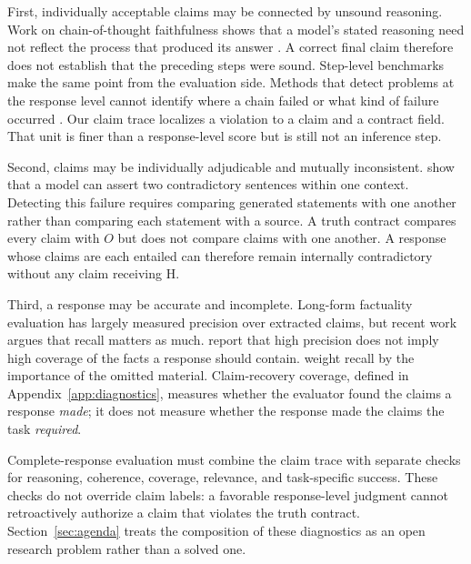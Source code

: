 \documentclass{clv2025}
\newcommand{\Hall}{\textsc{H}}
\begin{document}
First, individually acceptable claims may be connected by unsound reasoning.
Work on chain-of-thought faithfulness shows that a model's stated reasoning need
not reflect the process that produced its answer
\citep{arcuschin_cot_2025}. A correct final claim therefore does not establish
that the preceding steps were sound.
Step-level benchmarks make the same point from the evaluation side.
Methods that detect problems at the response level cannot identify where a
chain failed or what kind of failure occurred \citep{pham_grace_2026}.
Our claim trace localizes a violation to a claim and a contract field.
That unit is finer than a response-level score but is still not an inference
step.

Second, claims may be individually adjudicable and mutually inconsistent.
\citet{mundler_selfcontradictory_2024} show that a model can assert two
contradictory sentences within one context.
Detecting this failure requires comparing generated statements with one another
rather than comparing each statement with a source.
A truth contract compares every claim with $O$ but does not compare claims with
one another. A response whose claims are each entailed can therefore remain
internally contradictory without any claim receiving \Hall.

Third, a response may be accurate and incomplete.
Long-form factuality evaluation has largely measured precision over extracted
claims, but recent work argues that recall matters as much.
\citet{liu_verifact_2025} report that high precision does not imply high coverage
of the facts a response should contain. \citet{jafari_recall_2026} weight recall
by the importance of the omitted material.
Claim-recovery coverage, defined in
Appendix~\ref{app:diagnostics}, measures whether the evaluator found the claims
a response \emph{made}; it does not measure whether the response made the claims
the task \emph{required}.

Complete-response evaluation must combine the claim trace with separate checks
for reasoning, coherence, coverage, relevance, and task-specific success.
These checks do not override claim labels: a favorable response-level judgment
cannot retroactively authorize a claim that violates the truth contract.
Section~\ref{sec:agenda} treats the composition of these diagnostics as an open
research problem rather than a solved one.
\end{document}

